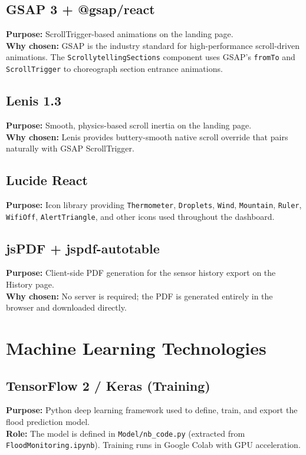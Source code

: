 \subsection{GSAP 3 + @gsap/react}
\textbf{Purpose:} ScrollTrigger-based animations on the landing page.\\
\textbf{Why chosen:} GSAP is the industry standard for high-performance scroll-driven animations. The \texttt{ScrollytellingSections} component uses GSAP's \texttt{fromTo} and \texttt{ScrollTrigger} to choreograph section entrance animations.

\subsection{Lenis 1.3}
\textbf{Purpose:} Smooth, physics-based scroll inertia on the landing page.\\
\textbf{Why chosen:} Lenis provides buttery-smooth native scroll override that pairs naturally with GSAP ScrollTrigger.

\subsection{Lucide React}
\textbf{Purpose:} Icon library providing \texttt{Thermometer}, \texttt{Droplets}, \texttt{Wind}, \texttt{Mountain}, \texttt{Ruler}, \texttt{WifiOff}, \texttt{AlertTriangle}, and other icons used throughout the dashboard.

\subsection{jsPDF + jspdf-autotable}
\textbf{Purpose:} Client-side PDF generation for the sensor history export on the History page.\\
\textbf{Why chosen:} No server is required; the PDF is generated entirely in the browser and downloaded directly.

\section{Machine Learning Technologies}

\subsection{TensorFlow 2 / Keras (Training)}
\textbf{Purpose:} Python deep learning framework used to define, train, and export the flood prediction model.\\
\textbf{Role:} The model is defined in \texttt{Model/\allowbreak{}nb\_\allowbreak{}code.\allowbreak{}py} (extracted from \texttt{FloodMonitoring.\allowbreak{}ipynb}). Training runs in Google Colab with GPU acceleration.

